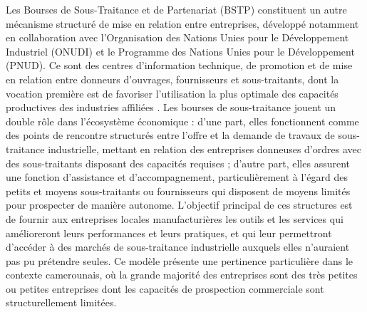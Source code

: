 \documentclass[12pt, a4paper, oneside]{report}
\begin{document}
	Les Bourses de Sous-Traitance et de Partenariat (BSTP) constituent un autre mécanisme structuré de mise en relation entre entreprises, développé notamment en collaboration avec l'Organisation des Nations Unies pour le Développement Industriel (ONUDI) et le Programme des Nations Unies pour le Développement (PNUD). Ce sont des centres d'information technique, de promotion et de mise en relation entre donneurs d'ouvrages, fournisseurs et sous-traitants, dont la vocation première est de favoriser l'utilisation la plus optimale des capacités productives des industries affiliées \cite{minpmeesa}. Les bourses de sous-traitance jouent un double rôle dans l'écosystème économique : d'une part, elles fonctionnent comme des points de rencontre structurés entre l'offre et la demande de travaux de sous-traitance industrielle, mettant en relation des entreprises donneuses d'ordres avec des sous-traitants disposant des capacités requises ; d'autre part, elles assurent une fonction d'assistance et d'accompagnement, particulièrement à l'égard des petits et moyens sous-traitants ou fournisseurs qui disposent de moyens limités pour prospecter de manière autonome. L'objectif principal de ces structures est de fournir aux entreprises locales manufacturières les outils et les services qui amélioreront leurs performances et leurs pratiques, et qui leur permettront d'accéder à des marchés de sous-traitance industrielle auxquels elles n'auraient pas pu prétendre seules. Ce modèle présente une pertinence particulière dans le contexte camerounais, où la grande majorité des entreprises sont des très petites ou petites entreprises dont les capacités de prospection commerciale sont structurellement limitées.
\end{document}
